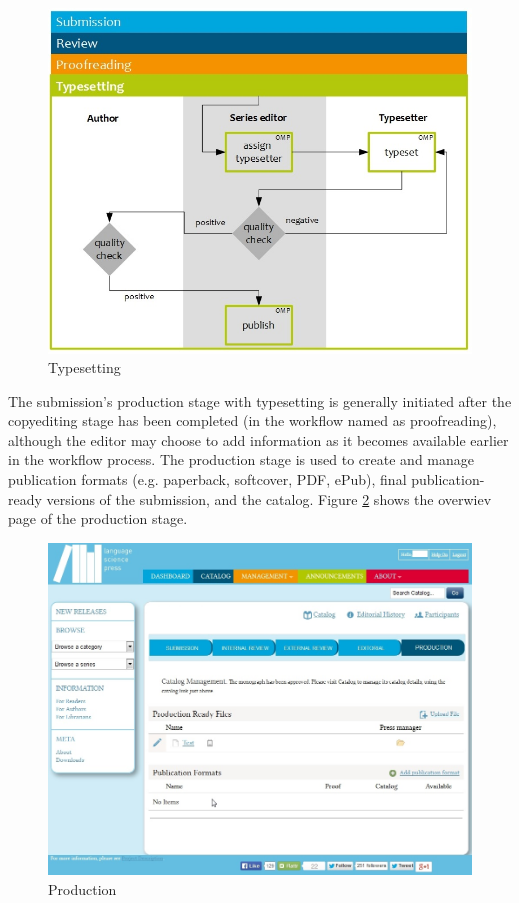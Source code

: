 \begin{figure}[h] \centering
\includegraphics[width=1\textwidth]{./img/workflow_typesetting.jpg} \caption{Typesetting}
\label{fig:workflowTypesetting}
\end{figure}


The submission's production stage with typesetting is generally initiated after the copyediting stage has been completed (in the workflow named as proofreading), although the editor may choose to add information as it becomes available earlier in the workflow process. The production stage is used to create and manage publication formats (e.g. paperback, softcover, PDF, ePub), final publication-ready versions of the submission, and the catalog. 
Figure \ref{fig:production} shows the overwiev page of the production stage.

\begin{figure}[h] \centering
\includegraphics[width=1\textwidth]{./img/production.jpg} \caption{Production}
\label{fig:production}
\end{figure}

